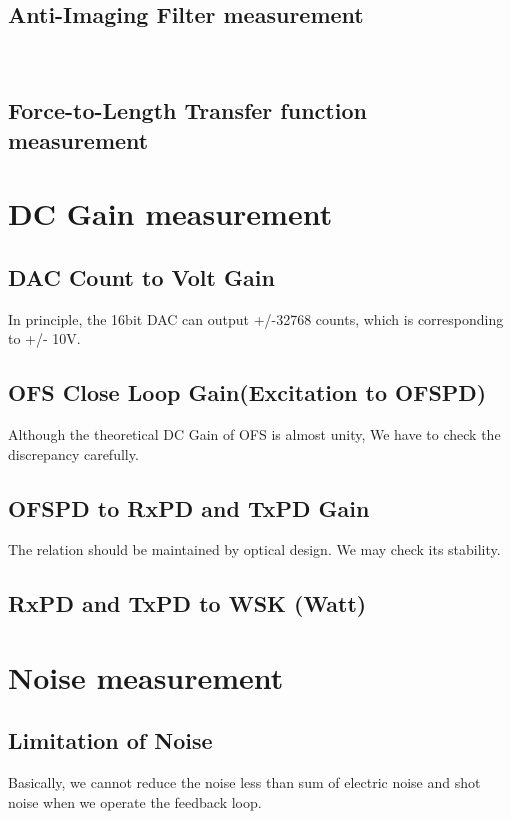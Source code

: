\subsection{Anti-Imaging Filter measurement}
     \\
    
\subsection{Force-to-Length Transfer function measurement}
\section{DC Gain measurement}
\subsection{DAC Count to Volt Gain}
    In principle, the 16bit DAC can output +/-32768 counts, which is corresponding to +/- 10V. 
\subsection{OFS Close Loop Gain(Excitation to OFSPD)}
    Although the theoretical DC Gain of OFS is almost unity, We have to check the discrepancy carefully. 
\subsection{OFSPD to RxPD and TxPD Gain}
    The relation should be maintained by optical design. We may check its stability.
\subsection{RxPD and TxPD to WSK (Watt)}


\section{Noise measurement}
\subsection{Limitation of Noise}
Basically, we cannot reduce the noise less than sum of electric noise and shot noise when we operate the feedback loop.

